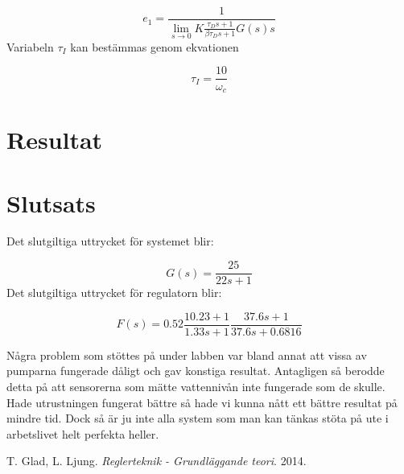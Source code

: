 \documentclass[a4paper]{article}
\begin{document}
\begin{equation}
  e_1=\frac{1}{\lim_{s \to 0}K\frac{\tau_Ds+1}{\beta\tau_Ds+1}G(s)s}
\end{equation}
Variabeln $\tau_I$ kan bestämmas genom ekvationen

\begin{equation}
  \tau_I=\frac{10}{\omega_c}
\end{equation}

\section{Resultat}



\section{Slutsats}

Det slutgiltiga uttrycket för systemet blir:

\begin{equation*}
  G(s)=\frac{25}{22s+1}
\end{equation*}
Det slutgiltiga uttrycket för regulatorn blir:

\begin{equation*}
  F(s)=0.52\frac{10.23+1}{1.33s+1} \frac{37.6s+1}{37.6s+0.6816}
\end{equation*}


Några problem som stöttes på under labben var bland annat att vissa av pumparna fungerade dåligt och gav konstiga resultat.
Antagligen så berodde detta på att sensorerna som mätte vattennivån inte fungerade som de skulle.
Hade utrustningen fungerat bättre så hade vi kunna nått ett bättre resultat på mindre tid.
Dock så är ju inte alla system som man kan tänkas stöta på ute i arbetslivet helt perfekta heller. 

\begin{thebibliography}{9}
    T. Glad, L. Ljung. 
    \emph{Reglerteknik - Grundläggande teori}.
    2014.
\end{thebibliography}
\end{document}
